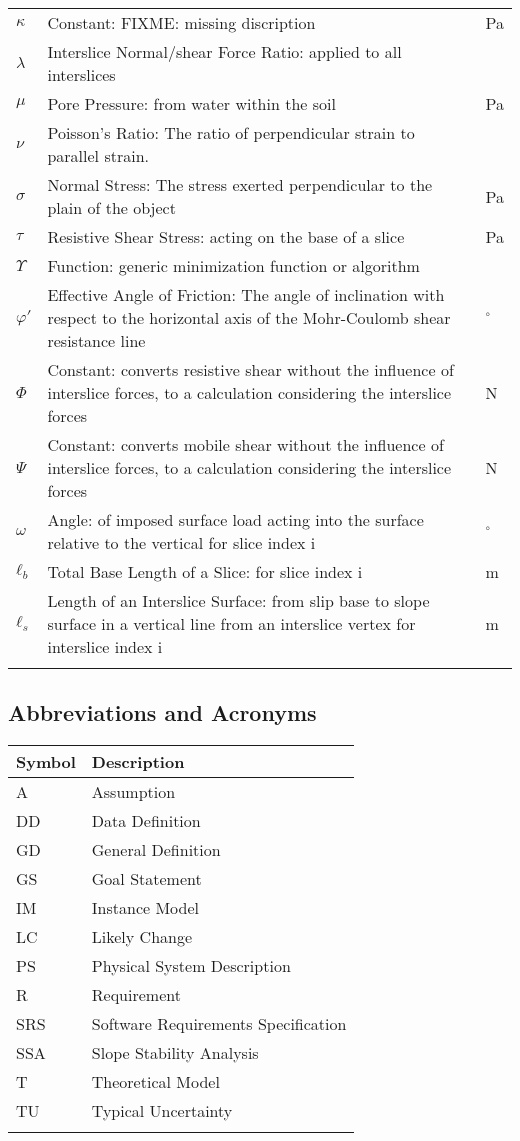\documentclass[12pt]{article}
\begin{document}
\begin{longtabu}{l X[l] l}
$κ$ & Constant: FIXME: missing discription & Pa
\\
$λ$ & Interslice Normal/shear Force Ratio: applied to all interslices & 
\\
$μ$ & Pore Pressure: from water within the soil & Pa
\\
$ν$ & Poisson's Ratio: The ratio of perpendicular strain to parallel strain. & 
\\
$σ$ & Normal Stress: The stress exerted perpendicular to the plain of the object & Pa
\\
$τ$ & Resistive Shear Stress: acting on the base of a slice & Pa
\\
$Υ$ & Function: generic minimization function or algorithm &
\\
$φ'$ & Effective Angle of Friction: The angle of inclination with respect to the horizontal axis of the Mohr-Coulomb shear resistance line & ${}^{\circ}$
\\
$Φ$ & Constant: converts resistive shear without the influence of interslice forces, to a calculation considering the interslice forces & N
\\
$Ψ$ & Constant: converts mobile shear without the influence of interslice forces, to a calculation considering the interslice forces & N
\\
$ω$ & Angle: of imposed surface load acting into the surface relative to the vertical for slice index i & ${}^{\circ}$
\\
${ℓ_{b}}$ & Total Base Length of a Slice: for slice index i & m
\\
${ℓ_{s}}$ & Length of an Interslice Surface: from slip base to slope surface in a vertical line from an interslice vertex for interslice index i & m
\\
\bottomrule
\label{Table:ToS}
\end{longtabu}
\subsection{Abbreviations and Acronyms}
\label{Sec:TAbbAcc}
\begin{longtable*}{l l}
\toprule
Symbol & Description
\\
\midrule
A & Assumption
\\
DD & Data Definition
\\
GD & General Definition
\\
GS & Goal Statement
\\
IM & Instance Model
\\
LC & Likely Change
\\
PS & Physical System Description
\\
R & Requirement
\\
SRS & Software Requirements Specification
\\
SSA & Slope Stability Analysis
\\
T & Theoretical Model
\\
TU & Typical Uncertainty
\\
\bottomrule
\label{Table:TAbbAcc}
\end{longtable*}
\end{document}
